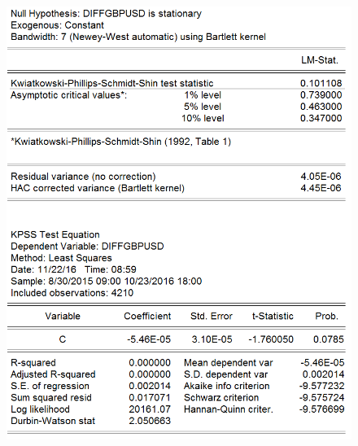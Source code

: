\documentclass[11pt]{report}
\begin{document}
\begin{figure}[!h]
\begin{minipage}[c]{.46\linewidth}
\includegraphics[scale=0.5]{Appendix/chap2/9}
\end{minipage} \hfill
\end{figure}
\end{document}
